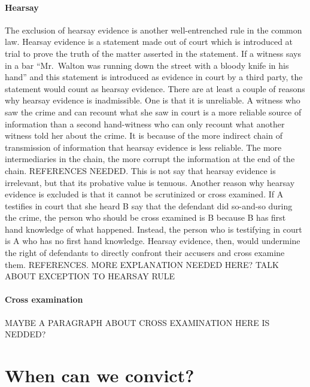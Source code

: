 \documentclass[10pt]{article}
\begin{document}
 \paragraph{Hearsay} The exclusion of hearsay evidence  is another well-entrenched rule in the common law. Hearsay evidence is a statement made out of court which is introduced at trial to prove the truth of the matter asserted in the statement. If a witness says in a bar  ``Mr.\ Walton was running down the street with a bloody knife in his hand'' and this statement is introduced as evidence in court by a third party, the statement would count as hearsay evidence. 
There are at least a couple of reasons why hearsay evidence is inadmissible. One is that it is unreliable. A witness who saw the crime and can recount what she saw in court is a more reliable source of information than a second hand-witness who can only recount what another witness told her about the crime. It is because of the more indirect chain of transmission of information that hearsay evidence is less reliable. The more intermediaries in the chain, the more corrupt the information at the end of the chain. REFERENCES NEEDED.  This is not say that hearsay evidence is irrelevant, but that its probative value is tenuous. Another reason why hearsay evidence is excluded is that it cannot be scrutinized or cross examined. If  A testifies in court that she heard B say that the defendant did so-and-so during the crime, the person who should be cross examined is B because B has first hand knowledge of what happened. Instead, the person who is testifying in court is  A who has no first hand knowledge. Hearsay evidence, then, would undermine the right of defendants to directly confront their accusers and cross examine them. REFERENCES. MORE EXPLANATION NEEDED HERE? TALK ABOUT EXCEPTION TO HEARSAY RULE


\paragraph{Cross examination} MAYBE A PARAGRAPH ABOUT CROSS EXAMINATION HERE IS NEDDED?






\section{When can we convict?}
\label{sec:whenconv}
\end{document}
